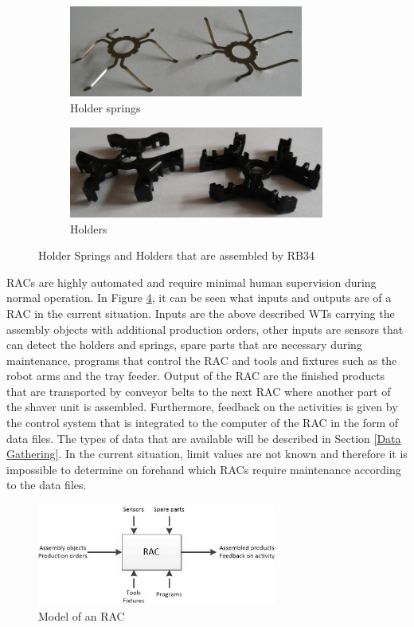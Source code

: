 \begin{figure}[ht]
\centering
\begin{subfigure}[b]{0.49\textwidth}
\includegraphics[width=\textwidth, height=3cm]{Figures/Afbeeldin1_Holder_springs}
\caption{Holder springs}
\label{fig:Holder springs}
\end{subfigure}
\begin{subfigure}[b]{0.49\textwidth}
\includegraphics[width=\textwidth, height=3cm]{Figures/Afbeelding2_Holders}
\caption{Holders}
\label{fig:Holders}
\end{subfigure}
\caption[Holder Springs and Holders that are assembled by RB34]{Holder Springs and Holders that are assembled by RB34}
\label{fig:Holders_Holder springs}
\end{figure}

RACs are highly automated and require minimal human supervision during normal operation. In Figure \ref{fig:RACmodel}, it can be seen what inputs and outputs are of a RAC \parencite{Mohamed2001} in the current situation. Inputs are the above described WTs carrying the assembly objects with additional production orders, other inputs are sensors that can detect the holders and springs, spare parts that are necessary during maintenance, programs that control the RAC and tools and fixtures such as the robot arms and the tray feeder. Output of the RAC are the finished products that are transported by conveyor belts to the next RAC where another part of the shaver unit is assembled. Furthermore, feedback on the activities is given by the control system that is integrated to the computer of the RAC in the form of data files. The types of data that are available will be described in Section \ref{Data Gathering}. In the current situation, limit values are not known and therefore it is impossible to determine on forehand which RACs require maintenance according to the data files.
\begin{figure}[ht]
\centering
\includegraphics[width=0.7\textwidth]{Figures/RACmodel}
\caption[Model of an RAC]{Model of an RAC}
\label{fig:RACmodel}
\end{figure}


